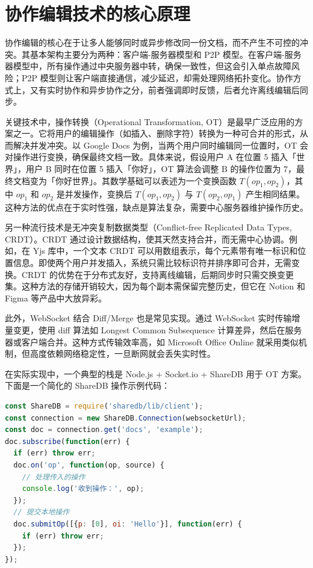 \chapter{协作编辑技术的核心原理}
协作编辑的核心在于让多人能够同时或异步修改同一份文档，而不产生不可控的冲突。其基本架构主要分为两种：客户端-服务器模型和 P2P 模型。在客户端-服务器模型中，所有操作通过中央服务器中转，确保一致性，但这会引入单点故障风险；P2P 模型则让客户端直接通信，减少延迟，却需处理网络拓扑变化。协作方式上，又有实时协作和异步协作之分，前者强调即时反馈，后者允许离线编辑后同步。\par
关键技术中，操作转换（Operational Transformation, OT）是最早广泛应用的方案之一。它将用户的编辑操作（如插入、删除字符）转换为一种可合并的形式，从而解决并发冲突。以 Google Docs 为例，当两个用户同时编辑同一位置时，OT 会对操作进行变换，确保最终文档一致。具体来说，假设用户 A 在位置 5 插入「世界」，用户 B 同时在位置 5 插入「你好」，OT 算法会调整 B 的操作位置为 7，最终文档变为「你好世界」。其数学基础可以表述为一个变换函数 $T(op_1, op_2)$，其中 $op_1$ 和 $op_2$ 是并发操作，变换后 $T(op_1, op_2)$ 与 $T(op_2, op_1)$ 产生相同结果。这种方法的优点在于实时性强，缺点是算法复杂，需要中心服务器维护操作历史。\par
另一种流行技术是无冲突复制数据类型（Conflict-free Replicated Data Types, CRDT）。CRDT 通过设计数据结构，使其天然支持合并，而无需中心协调。例如，在 Yjs 库中，一个文本 CRDT 可以用数组表示，每个元素带有唯一标识和位置信息。即使两个用户并发插入，系统只需比较标识符并排序即可合并，无需变换。CRDT 的优势在于分布式友好，支持离线编辑，后期同步时只需交换变更集。这种方法的存储开销较大，因为每个副本需保留完整历史，但它在 Notion 和 Figma 等产品中大放异彩。\par
此外，WebSocket 结合 Diff/Merge 也是常见实现。通过 WebSocket 实时传输增量变更，使用 diff 算法如 Longest Common Subsequence 计算差异，然后在服务器或客户端合并。这种方式传输效率高，如 Microsoft Office Online 就采用类似机制，但高度依赖网络稳定性，一旦断网就会丢失实时性。\par
在实际实现中，一个典型的栈是 Node.js + Socket.io + ShareDB 用于 OT 方案。下面是一个简化的 ShareDB 操作示例代码：\par
\begin{lstlisting}[language=javascript]
const ShareDB = require('sharedb/lib/client');
const connection = new ShareDB.Connection(websocketUrl);
const doc = connection.get('docs', 'example');
doc.subscribe(function(err) {
  if (err) throw err;
  doc.on('op', function(op, source) {
    // 处理传入的操作
    console.log('收到操作：', op);
  });
  // 提交本地操作
  doc.submitOp([{p: [0], oi: 'Hello'}], function(err) {
    if (err) throw err;
  });
});
\end{lstlisting}
